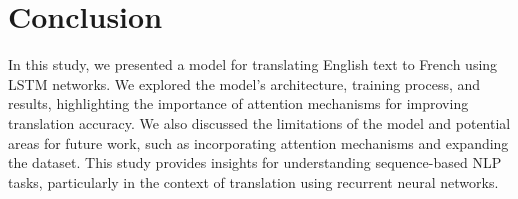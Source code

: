 \documentclass{article}
\begin{document}
\section{Conclusion}
In this study, we presented a model for translating English text to French using LSTM networks. We explored the model's architecture, training process, and results, highlighting the importance of attention mechanisms for improving translation accuracy. We also discussed the limitations of the model and potential areas for future work, such as incorporating attention mechanisms and expanding the dataset. This study provides insights for understanding sequence-based NLP tasks, particularly in the context of translation using recurrent neural networks.\\
\end{document}
